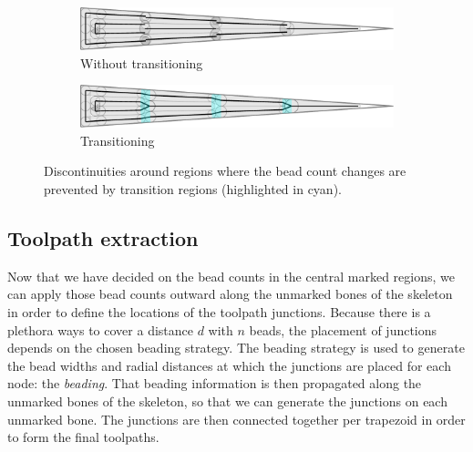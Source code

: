 \begin{figure}
\centering
\setlength{\figwidth}{\columnwidth}
\begin{subfigure}{0.9\figwidth}
\includegraphics[width=\columnwidth]{sources/method/wedge_distributed_generated__no_transitions.pdf}
\caption{Without transitioning}
\end{subfigure}
\begin{subfigure}{0.9\figwidth}
\includegraphics[width=\columnwidth]{sources/method/wedge_distributed_generated.pdf}
\caption{Transitioning}
\end{subfigure}
\caption{
Discontinuities around regions where the bead count changes are prevented by transition regions (highlighted in cyan).
}
\label{transitions}
\end{figure}

\subsection{Toolpath extraction}
\label{section_toolpath_extraction}
Now that we have decided on the bead counts in the central marked regions, we can apply those bead counts outward along the unmarked bones of the skeleton in order to define the locations of the toolpath junctions.
Because there is a plethora ways to cover a distance $d$ with $n$ beads, the placement of junctions depends on the chosen beading strategy.
The beading strategy is used to generate the bead widths and radial distances at which the junctions are placed for each node: the \emph{beading}.
That beading information is then propagated along the unmarked bones of the skeleton, so that we can generate the junctions on each unmarked bone.
The junctions are then connected together per trapezoid in order to form the final toolpaths.



